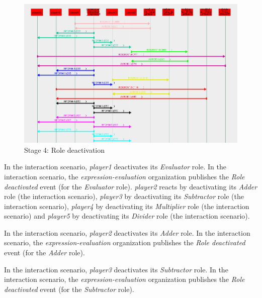 \begin{figure}[H]
	\centering
	\includegraphics[width=\textwidth]{images/examples/example2-stage4.png}
	\caption{Stage 4: Role deactivation}
	\label{figure:example2-stage4}
\end{figure}

In the {} interaction scenario, \textit{player1} deactivates its \textit{Evaluator} role.
In the {} interaction scenario, the \textit{expression-evaluation} organization publishes the \textit{Role deactivated} event (for the \textit{Evaluator} role).
\textit{player2} reacts by deactivating its \textit{Adder} role (the {} interaction scenario), \textit{player3} by deactivating its \textit{Subtractor} role (the {} interaction scenario), \textit{player4} by deactivating its \textit{Multiplier} role (the {} interaction scenario) and \textit{player5} by deactivating its \textit{Divider} role (the {} interaction scenario).

In the {} interaction scenario, \textit{player2} deactivates its \textit{Adder} role.
In the {} interaction scenario, the \textit{expression-evaluation} organization publishes the \textit{Role deactivated} event (for the \textit{Adder} role).

In the {} interaction scenario, \textit{player3} deactivates its \textit{Subtractor} role.
In the {} interaction scenario, the \textit{expression-evaluation} organization publishes the \textit{Role deactivated} event (for the \textit{Subtractor} role).

